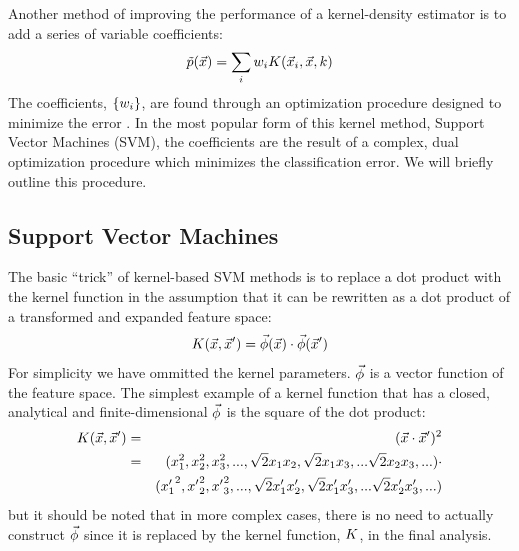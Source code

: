 \documentclass[11pt]{article}
\begin{document}
Another method of improving the performance of a kernel-density estimator
is to add a series of variable coefficients:
\begin{equation}
	\tilde p(\vec {x}) = \sum_i w_i K(\vec {x}_i, \vec {x}, k)
	\label{weighted_kernel_estimator}
\end{equation}
The coefficients, $\lbrace w_i \rbrace$, are found through an optimization
procedure designed to minimize the error \citep{Chen_etal2015}. In the most popular
form of this kernel method, Support Vector Machines (SVM), the coefficients
are the result of a complex, dual optimization procedure which minimizes
the classification error. We will briefly outline this procedure.

\subsection{Support Vector Machines}

The basic ``trick'' of kernel-based SVM methods is to replace a dot product
with the kernel function in the assumption that it can be rewritten
as a dot product of a transformed and expanded feature space:
\begin{equation}
	K(\vec {x}, \vec {x}^\prime) = \vec\phi(\vec {x}) \cdot \vec\phi(\vec {x}^\prime)
	\label{phi_def}
\end{equation}
For simplicity we have ommitted the kernel parameters.
$\vec\phi$ is a vector function of the feature space.
The simplest example of a kernel function that has a closed, analytical and
finite-dimensional $\vec\phi$ is the square of the dot product:
\begin{eqnarray}
	K(\vec {x}, \vec {x}^\prime) & = & (\vec {x} \cdot \vec {x}^\prime)^2 \\ \nonumber
					 & = & (x_1^2, x_2^2, x_3^2, ..., \sqrt{2} x_1 x_2, \sqrt{2} x_1 x_3, ... \sqrt{2} x_2 x_3, ...) \cdot \\ \nonumber
      & &	 ({x^\prime_1}^2, {x^\prime}_2^2, {x^\prime}_3^2, ..., \sqrt{2} x^\prime_1 x^\prime_2, \sqrt{2} x^\prime_1 x^\prime_3, ... \sqrt{2} x^\prime_2 x^\prime_3, ...) 
\end{eqnarray}
but it should be noted that in more complex cases, 
there is no need to actually construct $\vec\phi$ since it is replaced by the 
kernel function, $K$, in the final analysis.
\end{document}
